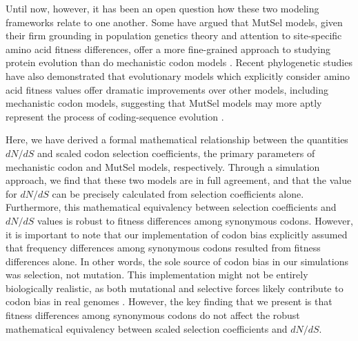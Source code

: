 \documentclass[11pt]{article}
\begin{document}
Until now, however, it has been an open question how these two modeling frameworks relate to one another. Some have argued that MutSel models, given their firm grounding in population genetics theory and attention to site-specific amino acid fitness differences, offer a more fine-grained approach to studying protein evolution than do mechanistic codon models \cite{HalpernBruno1998,Rodrigueetal2010}. Recent phylogenetic studies have also demonstrated that evolutionary models which explicitly consider amino acid fitness values offer dramatic improvements over other models, including mechanistic codon models, suggesting that MutSel models may more aptly represent the process of coding-sequence evolution \cite{Bloom2014a, Bloom2014b}. 

Here, we have derived a formal mathematical relationship between the quantities $dN/dS$ and scaled codon selection coefficients, the primary parameters of mechanistic codon and MutSel models, respectively. Through a simulation approach, we find that these two models are in full agreement, and that the value for $dN/dS$ can be precisely calculated from selection coefficients alone. Furthermore, this mathematical equivalency between selection coefficients and $dN/dS$ values is robust to fitness differences among synonymous codons. However, it is important to note that our implementation of codon bias explicitly assumed that frequency differences among synonymous codons resulted from fitness differences alone. In other words, the sole source of codon bias in our simulations was selection, not mutation. This implementation might not be entirely biologically realistic, as both mutational and selective forces likely contribute to codon bias in real genomes \cite{Blumer1991, Duret2002, HershbergPetrov2008, PlotkinKudla2010}. However, the key finding that we present is that fitness differences among synonymous codons do not affect the robust mathematical equivalency between scaled selection coefficients and $dN/dS$. 
\end{document}
